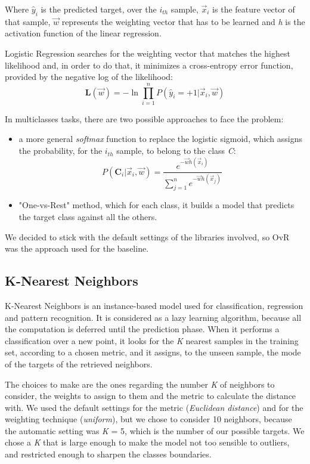 Where $ \hat{y}_{i} $ is the predicted target, over the  \textit{$i_{th}$} sample, \textit{$ \vec{x}_{i} $} is the feature vector of that sample, \textit{$ \vec{w} $} represents the weighting vector that has to be learned and \textit{h} is the activation function of the linear regression.

Logistic Regression searches for the weighting vector that matches the highest likelihood and, in order to do that, it minimizes a cross-entropy
error function, provided by the negative log of the likelihood:
\[{ \mathbf{L}(\vec{w}) = -\ln \prod\limits_{i=1}^{n} P(\hat{y}_{i} = +1 | \vec{x}_{i}, \vec{w})}\]

In multiclasses tasks, there are two possible approaches to face the problem:
\begin{itemize}
	\item[\PencilRight] a more general \textit{softmax} function to replace the logistic sigmoid, which assigns the probability, for the  \textit{$i_{th}$} sample, to belong to the class \textit{C}:
	\[{\displaystyle P(\mathbf{C}_{i} | \vec{x}_{i}, \vec{w})={\frac {e^{-\vec{w}h(\vec{x}_{i})}}{\sum\limits_{j = 1}^{n}e^{-\vec{w}h(\vec{x}_{j})}}}}\]
	\item[\PencilRight] "One-vs-Rest" method, which for each class, it builds a model that predicts the target class against all the others.
\end{itemize}
We decided to stick with the default settings of the libraries involved, so OvR was the approach used for the baseline.

\subsection{K-Nearest Neighbors}
K-Nearest Neighbors is an instance-based model used for classification, regression and pattern recognition. It is considered as a lazy learning algorithm, because all the computation is deferred until the prediction phase.
When it performs a classification over a new point, it looks for the \textit{K} nearest samples in the training set, according to a chosen metric, and it assigns, to the unseen sample, the mode of the targets of the retrieved neighbors.

The choices to make are the ones regarding the number \textit{K} of neighbors to consider, the weights to assign to them and the metric to calculate the distance with.
We used the default settings for the metric (\textit{Euclidean distance}) and for the weighting technique (\textit{uniform}), but we chose to consider 10 neighbors, because the automatic setting was \textit{K} = 5, which is the number of our possible targets.
We chose a \textit{K} that is large enough to make the model not too sensible to outliers, and restricted enough to sharpen the classes boundaries.

